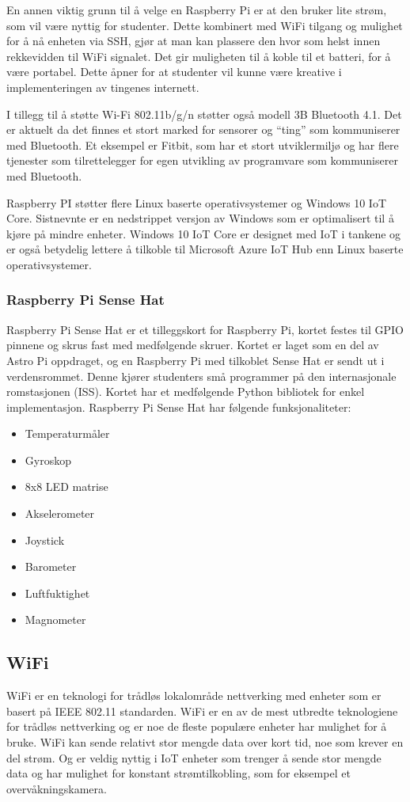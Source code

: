 \documentclass{article}
\begin{document}
En annen viktig grunn til å velge en Raspberry Pi er at den bruker lite strøm, som vil være nyttig for studenter. Dette kombinert med WiFi tilgang og mulighet for å nå enheten via SSH, gjør at man kan plassere den hvor som helst innen rekkevidden til WiFi signalet. Det gir muligheten til å koble til et batteri, for å være portabel. Dette åpner for at studenter vil kunne være kreative i implementeringen av tingenes internett.

I tillegg til å støtte Wi-Fi 802.11b/g/n støtter også modell 3B Bluetooth 4.1. Det er aktuelt da det finnes et stort marked for sensorer og “ting” som kommuniserer med Bluetooth. Et eksempel er Fitbit, som har et stort utviklermiljø og har flere tjenester som tilrettelegger for egen utvikling av programvare som kommuniserer med Bluetooth.

Raspberry PI støtter flere Linux baserte operativsystemer og Windows 10 IoT Core. Sistnevnte er en nedstrippet versjon av Windows som er optimalisert til å kjøre på mindre enheter.   Windows 10 IoT Core er designet med IoT i tankene og er også betydelig lettere å tilkoble til Microsoft Azure IoT Hub\cite{azureiothub} enn Linux baserte operativsystemer.

\subsubsection{Raspberry Pi Sense Hat}
Raspberry Pi Sense Hat er et tilleggskort for Raspberry Pi, kortet festes til GPIO pinnene og skrus fast med medfølgende skruer. Kortet er laget som en del av Astro Pi oppdraget, og en Raspberry Pi med tilkoblet Sense Hat er sendt ut i verdensrommet. Denne kjører studenters små programmer på den internasjonale romstasjonen (ISS). Kortet har et medfølgende Python bibliotek for enkel implementasjon. Raspberry Pi Sense Hat har følgende funksjonaliteter:

\begin{itemize}
	\item Temperaturmåler
	\item Gyroskop	
	\item 8x8 LED matrise
	\item Akselerometer
	\item Joystick
	\item Barometer
	\item Luftfuktighet
	\item Magnometer
\end{itemize}


\subsection{WiFi}
WiFi er en teknologi for trådløs lokalområde nettverking med enheter som er basert på IEEE 802.11 standarden. WiFi er en av de mest utbredte teknologiene for trådløs nettverking og er noe de fleste populære enheter har mulighet for å bruke. WiFi kan sende relativt stor mengde data over kort tid, noe som krever en del strøm. Og er veldig nyttig i IoT enheter som trenger å sende stor mengde data og har mulighet for konstant strømtilkobling, som for eksempel et overvåkningskamera.
\end{document}
